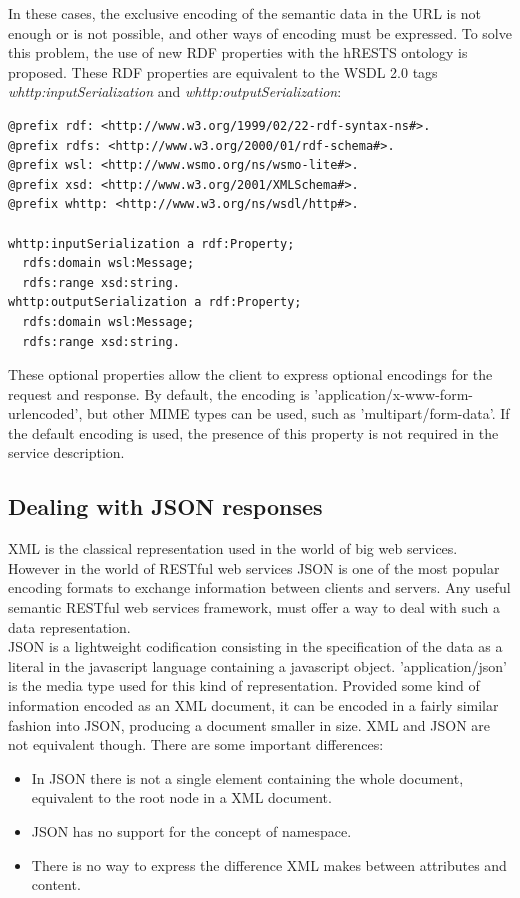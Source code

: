 In these cases, the exclusive encoding of the semantic data in the URL is not enough or is not possible, and other ways of encoding must be expressed. To solve this problem, the use of new RDF properties with the hRESTS ontology is proposed. These RDF properties are equivalent to the WSDL 2.0 tags \emph{whttp:inputSerialization} and \emph{whttp:outputSerialization}:
\vspace{5 mm}
\begin{lstlisting}
@prefix rdf: <http://www.w3.org/1999/02/22-rdf-syntax-ns#>. 
@prefix rdfs: <http://www.w3.org/2000/01/rdf-schema#>. 
@prefix wsl: <http://www.wsmo.org/ns/wsmo-lite#>. 
@prefix xsd: <http://www.w3.org/2001/XMLSchema#>. 
@prefix whttp: <http://www.w3.org/ns/wsdl/http#>.
 
whttp:inputSerialization a rdf:Property;
  rdfs:domain wsl:Message;
  rdfs:range xsd:string.
whttp:outputSerialization a rdf:Property;
  rdfs:domain wsl:Message;
  rdfs:range xsd:string.
\end{lstlisting} \vspace{5 mm}

These optional properties allow the client to express optional encodings for the request and response. By default, the encoding is 'application/x-www-form-urlencoded', but other MIME types can be used, such as 'multipart/form-data'. If the default encoding is used, the presence of this property is not required in the service description.

\subsection{Dealing with JSON responses}
XML is the classical representation used in the world of big web services. However in the world of RESTful web services JSON is one of the most popular encoding formats to exchange information between clients and servers. Any useful semantic RESTful web services framework, must offer a way to deal with such a data representation.\\
JSON is a lightweight codification consisting in the specification of the data as a literal in the javascript language containing a javascript object. 'application/json' is the media type used for this kind of representation. Provided some kind of information encoded as an XML document, it can be encoded in a fairly similar fashion into JSON, producing a document smaller in size. XML and JSON are not equivalent though. There are some important differences:

\begin{itemize}
  \item In JSON there is not a single element containing the whole document, equivalent to the root node in a XML document.
  \item JSON has no support for the concept of namespace.
  \item There is no way to express the difference XML makes between attributes and content.
\end{itemize}

